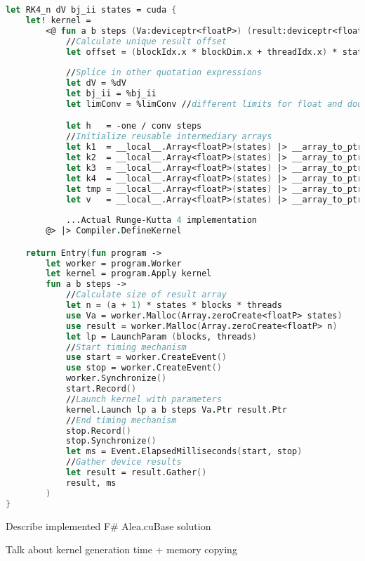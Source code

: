 \begin{lstlisting}[language=FSharp, caption=The Runge-Kutta 4 solver expressed in F\# Alea.cuBase, label=cubase_rk4_n_snippet]
let RK4_n dV bj_ii states = cuda {
    let! kernel =
        <@ fun a b steps (Va:deviceptr<floatP>) (result:deviceptr<floatP>) ->
            //Calculate unique result offset
            let offset = (blockIdx.x * blockDim.x + threadIdx.x) * states * (a + 1)
            
            //Splice in other quotation expressions
            let dV = %dV
            let bj_ii = %bj_ii
            let limConv = %limConv //different limits for float and double

            let h   = -one / conv steps
			//Initialize reusable intermediary arrays
            let k1  = __local__.Array<floatP>(states) |> __array_to_ptr
            let k2  = __local__.Array<floatP>(states) |> __array_to_ptr
            let k3  = __local__.Array<floatP>(states) |> __array_to_ptr
            let k4  = __local__.Array<floatP>(states) |> __array_to_ptr
            let tmp = __local__.Array<floatP>(states) |> __array_to_ptr
            let v   = __local__.Array<floatP>(states) |> __array_to_ptr
            
            ...Actual Runge-Kutta 4 implementation
        @> |> Compiler.DefineKernel 

    return Entry(fun program ->
        let worker = program.Worker
        let kernel = program.Apply kernel
        fun a b steps ->
            //Calculate size of result array
            let n = (a + 1) * states * blocks * threads
            use Va = worker.Malloc(Array.zeroCreate<floatP> states)
            use result = worker.Malloc(Array.zeroCreate<floatP> n)
            let lp = LaunchParam (blocks, threads)
            //Start timing mechanism
            use start = worker.CreateEvent()
            use stop = worker.CreateEvent()
            worker.Synchronize()
            start.Record()
            //Launch kernel with parameters
            kernel.Launch lp a b steps Va.Ptr result.Ptr
            //End timing mechanism
            stop.Record()
            stop.Synchronize()
            let ms = Event.ElapsedMilliseconds(start, stop)
            //Gather device results
            let result = result.Gather()
            result, ms
        )
}
\end{lstlisting}


Describe implemented F\# Alea.cuBase solution

Talk about kernel generation time + memory copying

